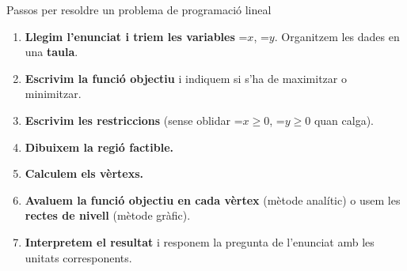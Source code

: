 \documentclass[11pt,a4paper]{article}
\newcommand{\fmm}[1]{\setbox0=\hbox{$#1$}\ifdim\wd0>\linewidth\fmdisp{#1}\else\mbox{\box0}\fi}
\newcommand{\fmdisp}[1]{\[\setbox2=\hbox{$\displaystyle #1$}\ifdim\wd2>\linewidth\resizebox{\linewidth}{!}{\box2}\else\box2\fi\]}
\begin{document}
\begin{fmdef}{Passos per resoldre un problema de programació lineal}
\begin{enumerate}
\item \textbf{Llegim l'enunciat i triem les variables} \fmm{x}, \fmm{y}. Organitzem les dades en una \textbf{taula}.
\item \textbf{Escrivim la funció objectiu} i indiquem si s'ha de maximitzar o minimitzar.
\item \textbf{Escrivim les restriccions} (sense oblidar \fmm{x\geq0}, \fmm{y\geq0} quan calga).
\item \textbf{Dibuixem la regió factible.}
\item \textbf{Calculem els vèrtexs.}
\item \textbf{Avaluem la funció objectiu en cada vèrtex} (mètode analític) o usem les \textbf{rectes de nivell} (mètode gràfic).
\item \textbf{Interpretem el resultat} i responem la pregunta de l'enunciat amb les unitats corresponents.
\end{enumerate}
\end{fmdef}
\end{document}
